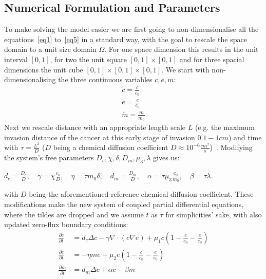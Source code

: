 \subsection{Numerical Formulation and Parameters}

To make solving the model easier we are first going to non-dimensionalise all the equations~\ref{eq1} to~\ref{eq5} in a standard way, with the goal to rescale the space domain to a unit size domain $\Omega$. For one space dimension this results in the unit interval $[0,1]$, for two the unit square $[0,1] \times [0,1]$ and for three spacial dimensions the unit cube $[0,1] \times [0,1] \times [0,1]$. \newline
We start with non-dimensionalising the three continuous variables $c,e,m$:
\begin{align*}
    \tilde{c} = \frac{c}{c_0} \\
    \tilde{e} = \frac{e}{e_0} \\
    \tilde{m} = \frac{m}{m_0}  
\end{align*}
Next we rescale distance with an appropriate length scale $L$ (e.g. the maximum invasion distance of the cancer at this early stage of invasion $0.1-1cm$) and time with $\tau = \frac{L^2}{D}$ ($D$ being a chemical diffusion coefficient $D\approx 10^{-6} \frac{cm^2}{s}$)~\cite{anderson_mathematical_2000}. \newline
Modifying the system's free parameters $D_c, \chi, \delta, D_m, \mu_3, \lambda$ gives us:  
\begin{center}
    $d_c = \frac{D_c}{D},\quad \gamma = \chi \frac{e_0}{D},\quad \eta = \tau m_0 \delta,\quad d_m = \frac{D_m}{D},\quad \alpha = \tau \mu_3 \frac{c_0}{m_0},\quad \beta = \tau \lambda$.
\end{center} 
with $D$ being the aforementioned reference chemical diffusion coefficient.\newline 
These modifications make the new system of coupled partial differential equations, where the tildes are dropped and we assume $t$ as $\tau$ for simplicities' sake, with also updated zero-flux boundary conditions:
\begin{align}
	\frac{\partial c}{\partial t} &= d_c \Delta c - \gamma \nabla \cdot (c\nabla e)  + \mu_1 c\left(1-\frac{c}{c_0}-\frac{e}{e_0}\right)\label{eq:6}\\
	\frac{\partial e}{\partial t} &= -\eta m e  + \mu_2 e\left(1-\frac{c}{c_0}-\frac{e}{e_0}\right)\label{eq:7}\\
	\frac{\partial m}{\partial t} &= d_m \Delta c + \alpha c - \beta m\label{eq:8}
\end{align}
